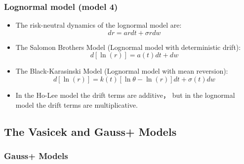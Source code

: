 \subsubsection{Lognormal model (model 4)}


\begin{itemize}
    \item The risk-neutral dynamics of the lognormal model are:
    \[
    dr = ar dt + \sigma r dw
    \]
    \item The Salomon Brothers Model (Lognormal model with deterministic drift):
    \[
    d[\ln(r)] = a(t)dt + dw
    \]
    \item The Black-Karasinski Model (Lognormal model with mean reversion):
    \[
    d[\ln(r)] = k(t)[\ln \theta - \ln(r)]dt + \sigma(t)dw
    \]
    \item In the Ho-Lee model the drift terms are additive， but in the lognormal model the drift terms are multiplicative.
\end{itemize}



\subsection{The Vasicek and Gauss+ Models}

\subsubsection{Gauss+ Models}

